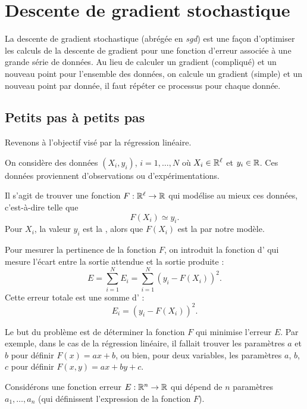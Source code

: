 \section{Descente de gradient stochastique}


La descente de gradient stochastique (abrégée en \emph{sgd}) est une façon d'optimiser les calculs
de la descente de gradient pour une fonction d'erreur associée à une grande série de données.
Au lieu de calculer un gradient (compliqué) et un nouveau point pour l'ensemble des données, on calcule un gradient (simple) et un nouveau point par donnée, il faut répéter ce processus pour chaque donnée.

\subsection{Petits pas à petits pas}

Revenons à l'objectif visé par la régression linéaire.

On considère des données $(X_i,y_i)$, $i=1,\ldots,N$ où $X_i \in \mathbb{R}^\ell$ et $y_i \in \mathbb{R}$.
Ces données proviennent d'observations ou d'expérimentations. 

Il s'agit de trouver une fonction $F : \mathbb{R}^\ell \to \mathbb{R} $ qui modélise au mieux ces données, c'est-à-dire telle que 
$$F(X_i) \simeq y_i.$$
Pour   $X_i$, la valeur $y_i$ est la  , alors que $F(X_i)$ est la   par notre modèle. 

Pour mesurer la pertinence de la fonction $F$, on introduit la fonction d'  qui mesure l'écart entre la sortie attendue et la sortie produite :
$$E = \sum_{i=1}^N E_i =  \sum_{i=1}^N(y_i - F(X_i))^2.$$
Cette erreur totale est une somme d'  :
$$E_i =  (y_i - F(X_i))^2.$$

Le but du problème est de déterminer la fonction $F$ qui minimise l'erreur $E$.
Par exemple, dans le cas de la régression linéaire, il fallait trouver les paramètres $a$ et $b$ pour définir $F(x) = ax+b$, ou bien, pour deux variables, les paramètres $a$, $b$, $c$ pour définir $F(x,y) = ax+by+c$.

Considérons une fonction erreur $E : \mathbb{R}^n \to \mathbb{R}$ qui dépend de $n$ paramètres $a_1,\ldots,a_n$ (qui définissent l'expression de la fonction $F$). 

